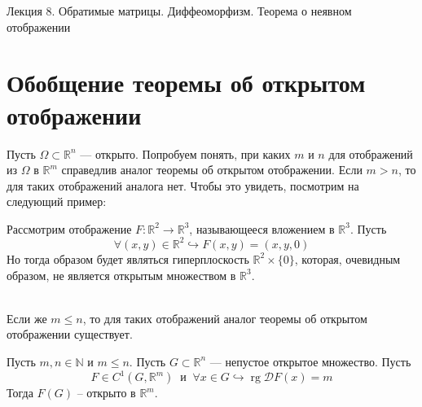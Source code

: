 \documentclass[11pt]{article}
\DeclareMathOperator{\rg}{rg}
\begin{document}
\begin{titlepage}
    \centering
    \vspace*{\fill}  %

    {\Huge Лекция 8. Обратимые матрицы. Диффеоморфизм. Теорема о неявном отображении}

    \vspace*{\fill}  %
\end{titlepage}

\setcounter{page}{1}

\section{Обобщение теоремы об открытом отображении}

Пусть $\Omega \subset \mathbb{R}^n$ --- открыто. Попробуем понять, при каких $m$ и $n$ для отображений из $\Omega$ в $\mathbb{R}^m$ справедлив аналог теоремы об открытом отображении. Если $m > n$, то для таких 
отображений аналога нет. Чтобы это увидеть, посмотрим на следующий пример:

\begin{example}
    Рассмотрим отображение $F \colon \mathbb{R}^2 \to \mathbb{R}^3$, называющееся вложением в $\mathbb{R}^3$. Пусть 
    \[\forall (x, y) \in \mathbb{R}^2 \hookrightarrow F(x, y) = (x, y, 0)\]
    Но тогда образом будет являться гиперплоскость $\mathbb{R}^2 \times \{0\}$, которая, очевидным образом, не является открытым множеством в $\mathbb{R}^3$.
\end{example} \leavevmode
\\
Если же $m \leq n$, то для таких отображений аналог теоремы об открытом отображении существует. 

\begin{theorem}
    Пусть $m, n \in \mathbb{N}$ и $m \leq n$. Пусть $G \subset \mathbb{R}^n$ --- непустое открытое множество.
    Пусть \[F \in C^1(G, \mathbb{R}^m) \ \text{ и } \ \forall x \in G \hookrightarrow \rg \mathcal{D}F(x) = m\]
    Тогда $F(G)$ -- открыто в $\mathbb{R}^m$.
\end{theorem}
\end{document}
